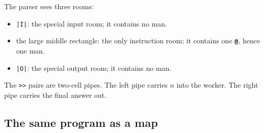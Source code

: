 \documentclass[11pt,a4paper]{article}
\newcommand{\op}[1]{\texttt{\bfseries #1}}
\begin{document}
\begin{plainbox}[title={Copyable \texttt{.man} source}]
\end{plainbox}

The parser sees three rooms:

\begin{itemize}
  \item \texttt{|I|}: the special input room; it contains no man.
  \item the large middle rectangle: the only instruction room; it contains
        one \op{@}, hence one man.
  \item \texttt{|O|}: the special output room; it contains no man.
\end{itemize}

The \texttt{>>} pairs are two-cell pipes. The left pipe carries \(n\) into
the worker. The right pipe carries the final answer out.

\subsection{The same program as a map}
\end{document}
